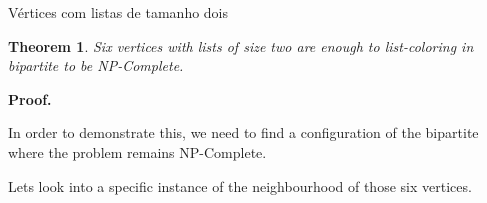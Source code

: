 \documentclass[9pt, compress]{beamer}
\newtheorem{teorema}{Theorem}
\newcommand{\?}{\textcolor{warn}{\textit{?}}}
\begin{document}
     \begin{frame}
       \begin{figure}[H]
        \centering
        \fontsize{4}{10}
        
      \end{figure}
     \end{frame}
     \begin{frame}
       \begin{figure}[H]
        \centering
        \fontsize{4}{10}
        
      \end{figure}
     \end{frame}
     \begin{frame}
       \begin{figure}[H]
        \centering
        \fontsize{4}{10}
        
      \end{figure}
     \end{frame}
     \begin{frame}
       \begin{figure}[H]
        \centering
        \fontsize{4}{10}
        
      \end{figure}
     \end{frame}
     \begin{frame}{Vértices com listas de tamanho dois}
       \begin{teorema}
         Six vertices with lists of size two are enough to list-coloring in bipartite to be NP-Complete.
       \end{teorema}
       \textbf{Proof.}
       
 
       In order to demonstrate this, we need to find a configuration of the bipartite where the problem remains NP-Complete.
       
       Lets look into a specific instance of the neighbourhood of those six vertices. 
       
     \end{frame}
     
\end{document}
